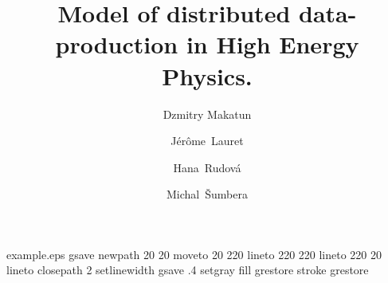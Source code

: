 %
%
%
%
%
%
\begin{filecontents*}{example.eps}
gsave
newpath
  20 20 moveto
  20 220 lineto
  220 220 lineto
  220 20 lineto
closepath
2 setlinewidth
gsave
  .4 setgray fill
grestore
stroke
grestore
\end{filecontents*}
%
\documentclass{svjour3}                     %
%
\smartqed  %
%
\usepackage{graphicx}
\usepackage{amsmath,amssymb}
%
%
%
%
%


\title{Model of distributed data-production in High Energy Physics.}


\author{Dzmitry Makatun         \and
		J\'er\^ome~Lauret		\and
		Hana~Rudov\'a			\and
		Michal~\v{S}umbera	
}

